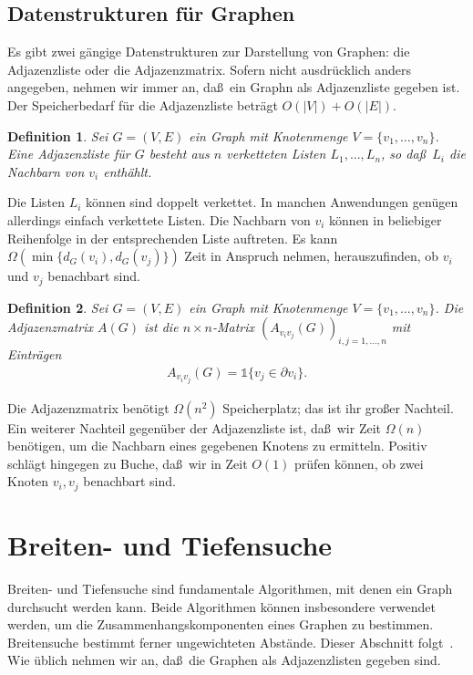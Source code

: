 \documentclass[10pt,reqno]{amsart}
\numberwithin{equation}{section}
\newtheorem{definition}{Definition}[section]
\newcommand{\vecone}{\mathbb{1}}
\begin{document}
\subsection{Datenstrukturen f\"ur Graphen}\label{sec_adj}
Es gibt zwei g\"angige Datenstrukturen zur Darstellung von Graphen: die Adjazenzliste oder die Adjazenzmatrix.
Sofern nicht ausdr\"ucklich anders angegeben, nehmen wir immer an, da\ss\ ein Graphn als Adjazenzliste gegeben ist.
Der Speicherbedarf f\"ur die Adjazenzliste betr\"agt $O(|V|)+O(|E|)$.

\begin{definition}\label{def_adj}
	Sei $G=(V,E)$ ein Graph mit Knotenmenge $V=\{v_1,\ldots,v_n\}$.
	Eine {\em Adjazenzliste} f\"ur $G$ besteht aus $n$ verketteten Listen $L_1,\ldots,L_n$, so da\ss\ $L_i$ die Nachbarn von $v_i$ enth\"ahlt.
\end{definition}

Die Listen $L_i$ k\"onnen sind doppelt verkettet.
In manchen Anwendungen gen\"ugen allerdings einfach verkettete Listen.
Die Nachbarn von $v_i$ k\"onnen in beliebiger Reihenfolge in der entsprechenden Liste auftreten.
Es kann $\Omega(\min\{d_G(v_i),d_G(v_j)\})$ Zeit in Anspruch nehmen, herauszufinden, ob $v_i$ und $v_j$ benachbart sind.

\begin{definition}\label{def_adjm}
	Sei $G=(V,E)$ ein Graph mit Knotenmenge $V=\{v_1,\ldots,v_n\}$.
	Die {\em Adjazenzmatrix} $A(G)$ ist die $n\times n$-Matrix $(A_{v_iv_j}(G))_{i,j=1,\ldots,n}$ mit Eintr\"agen
	\begin{align*}
		A_{v_iv_j}(G)=\vecone\{v_j\in\partial v_i\}.
	\end{align*}
\end{definition}

Die Adjazenzmatrix ben\"otigt $\Omega(n^2)$ Speicherplatz; das ist ihr gro\ss er Nachteil.
Ein weiterer Nachteil gegen\"uber der Adjazenzliste ist, da\ss\ wir Zeit $\Omega(n)$ ben\"otigen, um die Nachbarn eines gegebenen Knotens zu ermitteln.
Positiv schl\"agt hingegen zu Buche, da\ss\ wir in Zeit $O(1)$ pr\"ufen k\"onnen, ob zwei Knoten $v_i,v_j$ benachbart sind.

\section{Breiten- und Tiefensuche}\label{sec_connected}

\noindent
Breiten- und Tiefensuche sind fundamentale Algorithmen, mit denen ein Graph durchsucht werden kann.
Beide Algorithmen k\"onnen insbesondere verwendet werden, um die Zusammenhangskomponenten eines Graphen zu bestimmen.
Breitensuche bestimmt ferner ungewichteten Abst\"ande.
Dieser Abschnitt folgt~\cite{Cormen}.
Wie \"ublich nehmen wir an, da\ss\ die Graphen als Adjazenzlisten gegeben sind.
\end{document}
